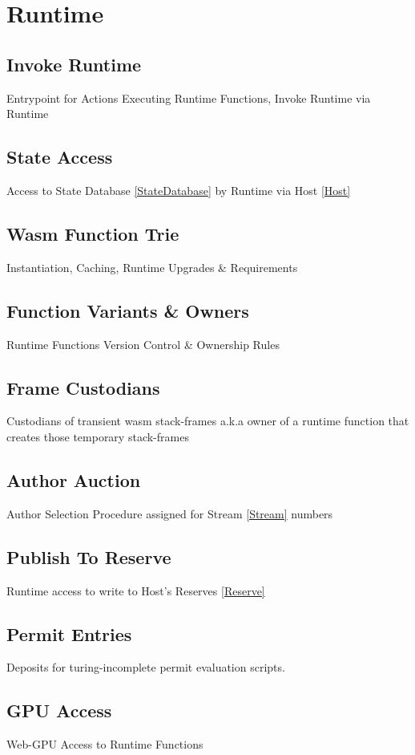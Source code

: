 \documentclass[../alan-handbook.tex]{subfiles}
\begin{document}
\section{Runtime} \label{Runtime}

\subsection{Invoke Runtime} \label{InvokeRuntime}

Entrypoint for Actions Executing Runtime Functions, Invoke Runtime via Runtime

\subsection{State Access} \label{RuntimeStateAccess}

Access to State Database \ref{StateDatabase} by Runtime via Host \ref{Host}

\subsection{Wasm Function Trie} \label{WasmFunctionTrie}

Instantiation, Caching, Runtime Upgrades \& Requirements

\subsection{Function Variants \& Owners} \label{FunctionVariantsOwners}

Runtime Functions Version Control \& Ownership Rules

\subsection{Frame Custodians} \label{FrameCustodians}

Custodians of transient wasm stack-frames a.k.a owner of a runtime function that creates those temporary stack-frames

\subsection{Author Auction} \label{AuthorAuction}

Author Selection Procedure assigned for Stream \ref{Stream} numbers

\subsection{Publish To Reserve} \label{RuntimePublishToReserve}

Runtime access to write to Host's Reserves \ref{Reserve}

\subsection{Permit Entries} \label{PermitEntries}

Deposits for turing-incomplete permit evaluation scripts.

\subsection{GPU Access} \label{RuntimeGPU}

Web-GPU Access to Runtime Functions
\end{document}
